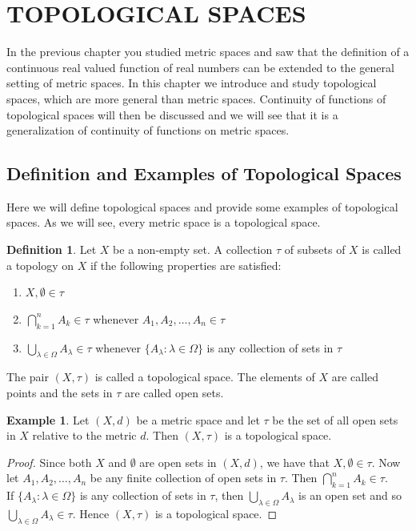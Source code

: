 \documentclass[11pt,a4paper]{article}
\theoremstyle{definition}
\newtheorem{defn}[thm]{Definition}
\newtheorem{exa}[thm]{Example}
\begin{document}
\section{TOPOLOGICAL SPACES}
In the previous chapter you studied metric spaces and saw that the definition of a continuous real valued function of real numbers can be extended to the general setting of metric spaces. In this chapter we introduce and study topological spaces, which are more general than metric spaces.
Continuity of functions of topological spaces will then be discussed and we will see that it is a generalization of continuity of functions on metric spaces.



\subsection{Definition and Examples of Topological Spaces}
Here we will define topological spaces and provide some examples of topological spaces. As we will see, every metric space is a topological space.



\begin{defn}
Let $X$ be a non-empty set. A collection $\tau$ of subsets of $X$ is called a topology on $X$ if the following properties are satisfied:
\begin{enumerate}
\item[i] $X,\emptyset \in \tau$
\item[ii] $\bigcap^{n}_{k=1} A_k\in \tau$ whenever $A_1,A_2,\ldots,A_n\in \tau$
\item[iii] $\bigcup_{\lambda \in \Omega} A_{\lambda} \in \tau$ whenever $\{A_{\lambda}:\lambda \in \Omega\}$ is any collection of sets in $\tau$
\end{enumerate}
The pair $(X,\tau)$ is called a topological space. The elements of $X$ are called points and the sets in $\tau$ are called open sets.
\end{defn}



\begin{exa}
Let $(X,d)$ be a metric space and let $\tau$ be the set of all open sets in $X$ relative to the metric $d$. Then $(X,\tau)$ is a topological space.
\end{exa}

\begin{proof}
Since both $X$ and $\emptyset$ are open sets in $(X,d)$, we have that $X,\emptyset \in \tau$.
Now let $A_1,A_2,\ldots,A_n$ be any finite collection of open sets in $\tau$. Then $\bigcap^{n}_{k=1} A_k \in \tau$.\\ 
If $\{A_{\lambda}:\lambda \in \Omega \}$ is any collection of sets in $\tau$, then $\bigcup_{\lambda \in \Omega} A_{\lambda}$ is an open set and so $\bigcup_{\lambda \in \Omega} A_{\lambda} \in \tau$. Hence $(X,\tau)$ is a topological space.
\end{proof}
\end{document}
